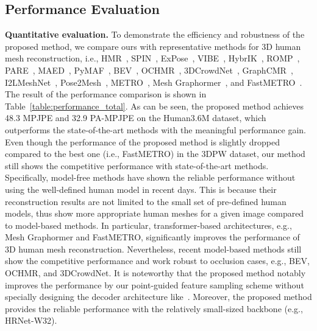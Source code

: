 \documentclass[10pt,twocolumn,letterpaper]{article}
\begin{document}
\subsection{Performance Evaluation}
\noindent\textbf{Quantitative evaluation.} To demonstrate the efficiency and robustness of the proposed method, we compare ours with representative methods for 3D human mesh reconstruction, i.e., HMR~\cite{Kanazawa18}, SPIN~\cite{Kolotouros19_ICCV}, ExPose~\cite{Choutas20}, VIBE~\cite{Kocabas20}, HybrIK~\cite{Li21}, ROMP~\cite{Sun21}, PARE~\cite{Kocabas21}, MAED~\cite{Wan21}, PyMAF~\cite{Zhang21}, BEV~\cite{Sun22}, OCHMR~\cite{Khirodkar22}, 3DCrowdNet~\cite{Choi22}, GraphCMR~\cite{Kolotouros19_CVPR}, I2LMeshNet~\cite{Moon2020}, Pose2Mesh~\cite{Choi20}, METRO~\cite{Lin21}, Mesh Graphormer~\cite{Lin21_ICCV}, and FastMETRO~\cite{Cho22}. The result of the performance comparison is shown in Table~\ref{table:performance_total}. As can be seen, the proposed method achieves 48.3 MPJPE and 32.9 PA-MPJPE on the Human3.6M dataset, which outperforms the state-of-the-art methods with the meaningful performance gain. Even though the performance of the proposed method is slightly dropped compared to the best one (i.e., FastMETRO) in the 3DPW dataset, our method still shows the competitive performance with state-of-the-art methods. Specifically, model-free methods have shown the reliable performance without using the well-defined human model in recent days. This is because their reconstruction results are not limited to the small set of pre-defined human models, thus show more appropriate human meshes for a given image compared to model-based methods. In particular, transformer-based architectures, e.g., Mesh Graphormer and FastMETRO, significantly improves the performance of 3D human mesh reconstruction. Nevertheless, recent model-based methods still show the competitive performance and work robust to occlusion cases, e.g., BEV, OCHMR, and 3DCrowdNet. It is noteworthy that the proposed method notably improves the performance by our point-guided feature sampling scheme without specially designing the decoder architecture like~\cite{Cho22}. Moreover, the proposed method provides the reliable performance with the relatively small-sized backbone (e.g., HRNet-W32).
\end{document}
